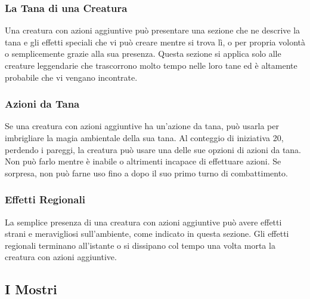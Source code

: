 \subsubsection{La Tana di una Creatura}

Una creatura con azioni aggiuntive può presentare una sezione che ne descrive la tana e gli effetti speciali che vi può  creare mentre si trova lì, o per propria volontà o  semplicemente grazie alla sua presenza. Questa  sezione si applica solo alle creature leggendarie che  trascorrono molto tempo nelle loro tane ed è altamente  probabile che vi vengano incontrate.

\subsubsection{Azioni da Tana}

Se una creatura con azioni aggiuntive ha un'azione da tana, può  usarla per imbrigliare la magia ambientale della sua  tana. Al conteggio di iniziativa 20, perdendo i pareggi,  la creatura può usare una delle sue opzioni di azioni da  tana. Non può farlo mentre è inabile o altrimenti  incapace di effettuare azioni. Se sorpresa, non può  farne uso fino a dopo il suo primo turno di combattimento.

\subsubsection{Effetti Regionali}

La semplice presenza di una creatura con azioni aggiuntive può  avere effetti strani e meravigliosi sull'ambiente, come  indicato in questa sezione. Gli effetti regionali terminano all'istante o si dissipano col tempo una volta  morta la creatura con azioni aggiuntive.

\pagebreak
\subsection{I Mostri}

\bigskip

